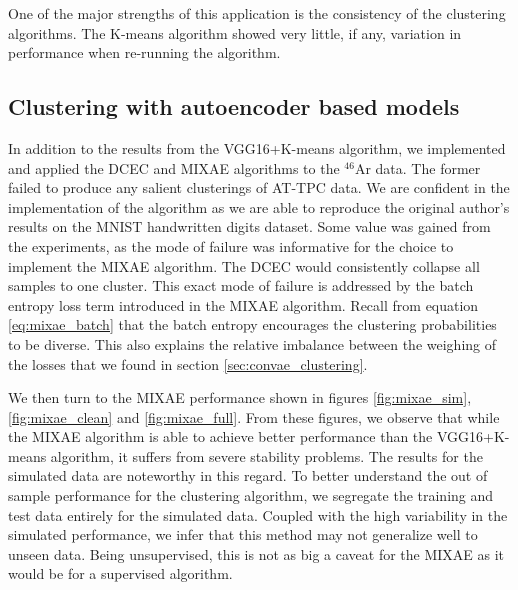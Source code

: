 One of the major strengths of this application is the consistency of the clustering algorithms. The K-means algorithm showed very little, if any, variation in performance when re-running the algorithm. 

\subsection{Clustering with autoencoder based models}

In addition to the results from the VGG16+K-means algorithm, we implemented and applied the DCEC and MIXAE algorithms to the ${}^{46}$Ar data. The former failed to produce any salient clusterings of AT-TPC data. We are confident in the implementation of the algorithm as we are able to reproduce the original author's results on the MNIST handwritten digits dataset. Some value was gained from the experiments, as the mode of failure was informative for the choice to implement the MIXAE algorithm. The DCEC would consistently collapse all samples to one cluster. This exact mode of failure is addressed by the batch entropy loss term introduced in the MIXAE algorithm. Recall from equation \ref{eq:mixae_batch} that the batch entropy encourages the clustering probabilities to be diverse. This also explains the relative imbalance between the weighing of the losses that we found in section \ref{sec:convae_clustering}.

We then turn to the MIXAE performance shown in figures \ref{fig:mixae_sim}, \ref{fig:mixae_clean} and \ref{fig:mixae_full}. From these figures, we observe that while the MIXAE algorithm is able to achieve better performance than the VGG16+K-means algorithm, it suffers from severe stability problems. The results for the simulated data are noteworthy in this regard. To better understand the out of sample performance for the clustering algorithm, we segregate the training and test data entirely for the simulated data. Coupled with the high variability in the simulated performance, we infer that this method may not generalize well to unseen data. Being unsupervised, this is not as big a caveat for the MIXAE as it would be for a supervised algorithm.

